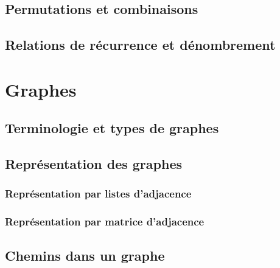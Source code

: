 \documentclass[
  letterpaper,
]{scrbook}
\theoremstyle{plain}
\theoremstyle{definition}
\theoremstyle{definition}
\theoremstyle{remark}
\begin{document}
\hypertarget{permutations-et-combinaisons}{%
\section{Permutations et
combinaisons}\label{permutations-et-combinaisons}}

\hypertarget{relations-de-ruxe9currence-et-duxe9nombrement}{%
\section{Relations de récurrence et
dénombrement}\label{relations-de-ruxe9currence-et-duxe9nombrement}}


\hypertarget{graphes}{%
\chapter{Graphes}\label{graphes}}

\hypertarget{terminologie-et-types-de-graphes}{%
\section{Terminologie et types de
graphes}\label{terminologie-et-types-de-graphes}}

\hypertarget{repruxe9sentation-des-graphes}{%
\section{Représentation des
graphes}\label{repruxe9sentation-des-graphes}}

\hypertarget{repruxe9sentation-par-listes-dadjacence}{%
\subsection{Représentation par listes
d'adjacence}\label{repruxe9sentation-par-listes-dadjacence}}

\hypertarget{repruxe9sentation-par-matrice-dadjacence}{%
\subsection{Représentation par matrice
d'adjacence}\label{repruxe9sentation-par-matrice-dadjacence}}

\hypertarget{chemins-dans-un-graphe}{%
\section{Chemins dans un graphe}\label{chemins-dans-un-graphe}}
\end{document}
